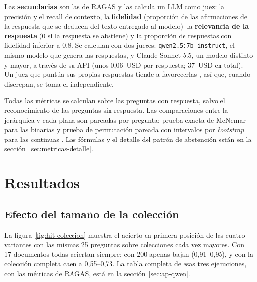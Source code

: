 Las \textbf{secundarias} son las de RAGAS \cite{es2023ragas} y las calcula un LLM como juez: la precisión y el recall de contexto, la \textbf{fidelidad} (proporción de las afirmaciones de la respuesta que se deducen del texto entregado al modelo), la \textbf{relevancia de la respuesta} (0 si la respuesta se abstiene) y la proporción de respuestas con fidelidad inferior a 0,8. Se calculan con dos jueces: \texttt{qwen2.5:7b-instruct}, el mismo modelo que genera las respuestas, y Claude Sonnet 5.5, un modelo distinto y mayor, a través de su API (unos 0,06~USD por respuesta; 37~USD en total). Un juez que puntúa sus propias respuestas tiende a favorecerlas \cite{zheng2023judge,panickssery2024self}, así que, cuando discrepan, se toma el independiente.

Todas las métricas se calculan sobre las preguntas con respuesta, salvo el reconocimiento de las preguntas sin respuesta. Las comparaciones entre la jerárquica y cada plana son pareadas por pregunta: prueba exacta de McNemar \cite{mcnemar1947} para las binarias y prueba de permutación pareada con intervalos por \emph{bootstrap} para las continuas \cite{smucker2007}. Las fórmulas y el detalle del patrón de abstención están en la sección~\ref{sec:metricas-detalle}.

\section{Resultados}
\label{sec:resultados}

\subsection{Efecto del tamaño de la colección}
\label{sec:resultados-coleccion}

La figura~\ref{fig:hit-coleccion} muestra el acierto en primera posición de las cuatro variantes con las mismas 25 preguntas sobre colecciones cada vez mayores. Con 17 documentos todas aciertan siempre; con 200 apenas bajan (0,91--0,95), y con la colección completa caen a 0,55--0,73. La tabla completa de esas tres ejecuciones, con las métricas de RAGAS, está en la sección~\ref{sec:ap-qwen}.

